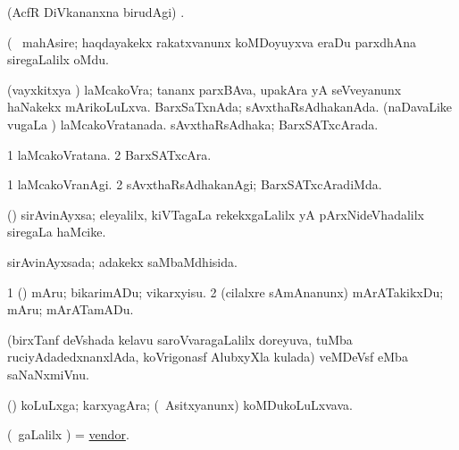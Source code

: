 \bentry
{}
\gl{\saMkiSx}
\expl{}
\bmng
 (AcfR DiVkananxna birudAgi) . 
\emng
\eentry

\bentry
{} 
\gl{\nA}(\bava\ 
\bmng
 mahAsire; haqdayakekx rakatxvanunx koMDoyuyxva eraDu parxdhAna siregaLalilx oMdu. 
\emng
\eentry

\bentry
{} 
\gl{\gu}
\expl{}
\bmng
\bnum
{} (vayxkitxya \vi) 
\banum
{} laMcakoVra; tananx parxBAva, upakAra yA seVveyanunx haNakekx mArikoLuLxva. 
 BarxSaTxnAda; sAvxthaRsAdhakanAda. 
\eanum
\numie
{} (naDavaLike \mo vugaLa \vi) 
\banum
{} laMcakoVratanada. 
 sAvxthaRsAdhaka; BarxSATxcArada. 
\eanum
\numie
\enum
\emng
\eentry

\bentry
{} 
\gl{\nA}
\expl{}
\bmng
\bnum
\num{1} laMcakoVratana. 
\num{2} BarxSATxcAra. 
\enum
\emng
\eentry

\bentry
{} 
\gl{\kirxvi}
\expl{}
\bmng
\bnum
\num{1} laMcakoVranAgi. 
\num{2} sAvxthaRsAdhakanAgi; BarxSATxcAradiMda. 
\enum
\emng
\eentry

\bentry
{} 
\gl{\nA}
\bmng
 (\savi) sirAvinAyxsa; eleyalilx, kiVTagaLa rekekxgaLalilx yA pArxNideVhadalilx siregaLa haMcike.  
\emng
\eentry

\bentry
{} 
\gl{\gu}
\expl{}
\bmng
 sirAvinAyxsada; adakekx saMbaMdhisida. 
\emng
\eentry

\bentry
{} 
\gl{\sakirx}
\expl{}
\bmng
\bnum
\num{1} (\nAyxshA) mAru; bikarimADu; vikarxyisu. 
\num{2} (cilalxre sAmAnanunx) mArATakikxDu; mAru; mArATamADu. 
\enum
\emng
\eentry

\bentry
{} 
\gl{\nA}
\expl{}
\bmng
 (birxTanf deVshada kelavu saroVvaragaLalilx doreyuva, tuMba ruciyAdadedxnanxlAda, koVrigonasf AlubxyXla kulada) veMDeVsf eMba saNaNxmiVnu. 
\emng
\eentry

\bentry
{} 
\gl{\nA}
\expl{}
\bmng
 (\nAyxshA) koLuLxga; karxyagAra; (\kanmu\ Asitxyanunx) koMDukoLuLxvava. 
\emng
\eentry

\bentry
{} 
\gl{\nA}
\expl{}
\bmng
 (\sA\ \saMpa gaLalilx \parx) = \hyperlink{vendor}{vendor}. 
\emng
\eentry

